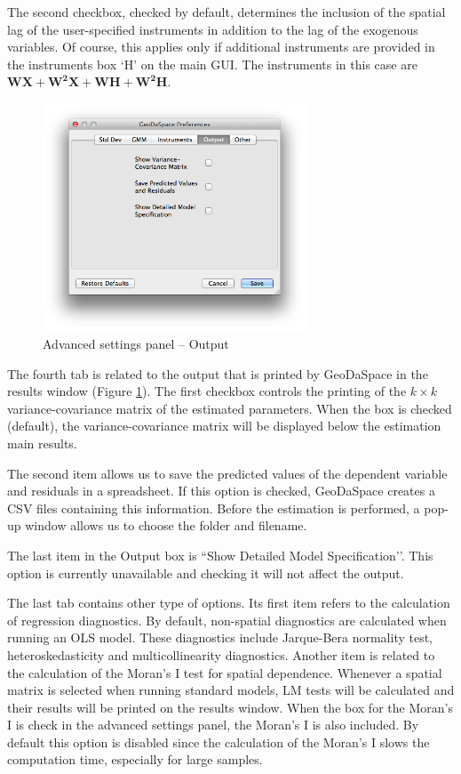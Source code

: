 \documentclass{article}
\begin{document}
The second checkbox, checked by default, determines the inclusion of the spatial lag of the user-specified instruments in addition to the lag of the exogenous variables. Of course, this applies only if additional instruments are provided in the instruments box `H’ on the main GUI. The instruments in this case are $\mathbf{WX} + \mathbf{W^2X} + \mathbf{WH} + \mathbf{W^2H}$.
\FloatBarrier

\begin{figure}[htb]
\centering
\caption{Advanced settings panel -- Output}
\label{f:adv_out}
\includegraphics[width=0.7\textwidth]{adv_out.png}
\end{figure}
\FloatBarrier

The fourth tab is related to the output that is printed by GeoDaSpace in the results window (Figure \ref{f:adv_out}).  The first checkbox controls the printing of the $k \times k$ variance-covariance matrix of the estimated parameters. When the box is checked (default), the variance-covariance matrix will be displayed below the estimation main results.

The second item allows us to save the predicted values of the dependent variable and residuals in a spreadsheet. If this option is checked, GeoDaSpace creates a CSV files containing this information. Before the estimation is performed, a pop-up window allows us to choose the folder and filename.

The last item in the Output box is ``Show Detailed Model Specification’’. This option is currently unavailable and checking it will not affect the output.

The last tab contains other type of options. Its first item refers to the calculation of regression diagnostics. By default, non-spatial diagnostics are calculated when running an OLS model. These diagnostics include Jarque-Bera normality test, heteroskedasticity and multicollinearity diagnostics. Another item is related to the calculation of the Moran’s I test for spatial dependence. Whenever a spatial matrix is selected when running standard models, LM tests will be calculated and their results will be printed on the results window. When the box for the Moran’s I is check in the advanced settings panel, the Moran’s I is also included. By default this option is disabled since the calculation of the Moran’s I slows the computation time, especially for large samples.
\end{document}
